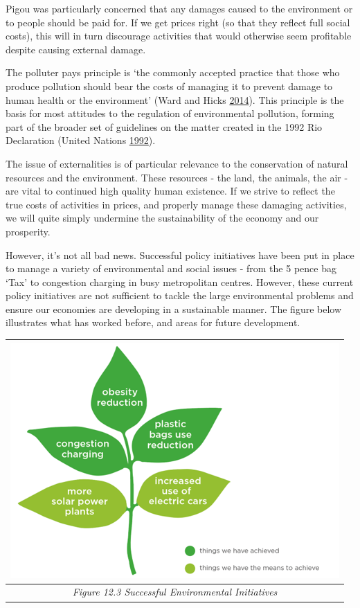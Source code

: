 \documentclass[]{tufte-handout}
\begin{document}
Pigou was particularly concerned that any damages caused to the
environment or to people should be paid for. If we get prices right (so
that they reflect full social costs), this will in turn discourage
activities that would otherwise seem profitable despite causing external
damage.

The polluter pays principle is `the commonly accepted practice that
those who produce pollution should bear the costs of managing it to
prevent damage to human health or the environment' (Ward and Hicks
\protect\hyperlink{ref-GranthamResearchInstituteonclimatechangeandtheenvironment2014}{2014}).
This principle is the basis for most attitudes to the regulation of
environmental pollution, forming part of the broader set of guidelines
on the matter created in the 1992 Rio Declaration (United Nations
\protect\hyperlink{ref-UnitedNations1992}{1992}).

The issue of externalities is of particular relevance to the
conservation of natural resources and the environment. These resources -
the land, the animals, the air - are vital to continued high quality
human existence. If we strive to reflect the true costs of activities in
prices, and properly manage these damaging activities, we will quite
simply undermine the sustainability of the economy and our prosperity.

However, it's not all bad news. Successful policy initiatives have been
put in place to manage a variety of environmental and social issues -
from the 5 pence bag `Tax' to congestion charging in busy metropolitan
centres. However, these current policy initiatives are not sufficient to
tackle the large environmental problems and ensure our economies are
developing in a sustainable manner. The figure below illustrates what
has worked before, and areas for future development.

\begin{longtable}[]{@{}c@{}}
\toprule
\includegraphics{OtherPictures/EnvironmentalInitiatives.png}\tabularnewline
\midrule
\endhead
\emph{Figure 12.3 Successful Environmental Initiatives}\tabularnewline
\bottomrule
\end{longtable}
\end{document}
